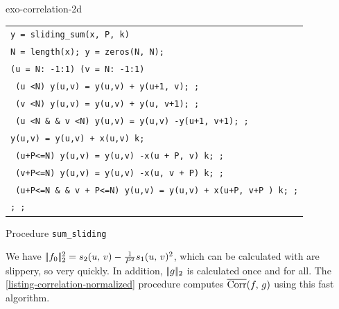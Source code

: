 \begin{correction}{exo-correlation-2d}
\begin{enumerate}
\begin{listing} 
\begin{footnotesize}
{\upshape
\begin{tabular}{l} \texttt{\pfunction y = sliding\_sum(x, P, k)} \\
\texttt{N = length(x); y = zeros(N, N);} \\
\texttt{\pfor{}(u = N: -1:1) \pfor{}(v = N: -1:1)} \\
\quad \texttt{\pif{} (u <N) y(u,v) = y(u,v) + y(u+1, v); \pend{};} \\
\quad \texttt{\pif{} (v <N) y(u,v) = y(u,v) + y(u, v+1); \pend{};} \\
\quad \texttt{\pif{} (u <N \& \& v <N) y(u,v) = y(u,v) -y(u+1, v+1); \pend{};} \\
\quad \texttt{y(u,v) = y(u,v) + x(u,v) \hatverb{} k;} \\
\quad \texttt{\pif{} (u+P<=N) y(u,v) = y(u,v) -x(u + P, v) \hatverb{} k; \pend{};} \\
\quad \texttt{\pif{} (v+P<=N) y(u,v) = y(u,v) -x(u, v + P) \hatverb{} k; \pend{};} \\
\quad \texttt{\pif{} (u+P<=N \& \& v + P<=N) y(u,v) = y(u,v) + x(u+P, v+P ) \hatverb{} k; \pend{};} \\
\texttt{\pend{}; \pend{};} \\
\end{tabular}
}
\end{footnotesize}
\caption{Procedure \texttt{\upshape sum\_sliding}}
\label{sliding-sum-listing}
\end{listing}

We have $ |\!| f_0 |\!|_2^2 = s_2 (u, \, v) - \tfrac{1}{P^2} s_1 (u, \, v)^2 $, which can be calculated with are slippery, so very quickly. In addition, $ |\!| g |\!|_2 $ is calculated once and for all. The \ref{listing-correlation-normalized} procedure computes $ \overline{\operatorname{Corr}} (f, \, g) $ using this fast algorithm.


\end{enumerate}
\end{correction}
